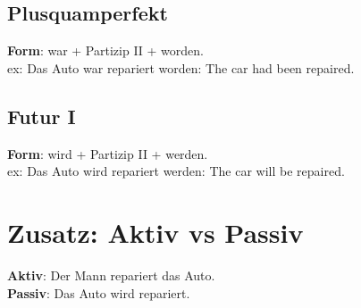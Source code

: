 \documentclass[a4paper]{article}
\begin{document}
        \subsection{Plusquamperfekt}
            \textbf{Form}: war + Partizip II + worden.\\
            ex: Das Auto war repariert worden: The car had been repaired.\\
        
        \subsection{Futur I}
            \textbf{Form}: wird + Partizip II + werden.\\
            ex: Das Auto wird repariert werden: The car will be repaired.\\
    
    
    \section{Zusatz: Aktiv vs Passiv}
        \textbf{Aktiv}: Der Mann repariert das Auto.\\
        \textbf{Passiv}: Das Auto wird repariert.\\
\end{document}

